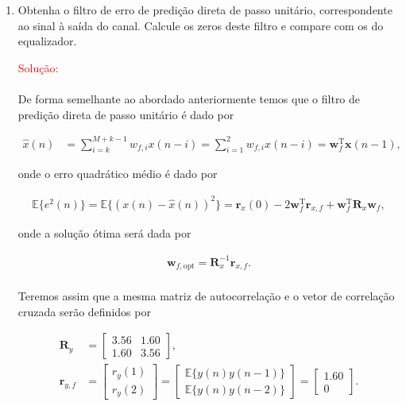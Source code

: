 \documentclass[a4paper,10pt]{article}
\begin{document}
\begin{enumerate}
\begin{enumerate}
					\item Obtenha o ﬁltro de erro de predição direta de passo unitário, correspondente ao sinal à saída do canal. Calcule os zeros deste ﬁltro e compare com os do equalizador.
					
						\textcolor{red}{Solução:}

						\paragraph{}De forma semelhante ao abordado anteriormente temos que o filtro de predição direta de passo unitário é dado por
						
						\begin{align}
							\hat{x}(n) &= \sum^{M + k - 1}_{i = k} w_{f,i} x(n - i) = \sum^{2}_{i = 1} w_{f,i} x(n - i) = \mathbf{w}^{\text{T}}_{f} \mathbf{x}(n - 1),
						\end{align}

						onde o erro quadrático médio é dado por

						\begin{align}
							\mathbb{E}\{e^{2}(n)\} = \mathbb{E}\{(x(n) - \hat{x}(n) )^{2}\} = \mathbf{r}_{x}(0) - 2 \mathbf{w}^{\text{T}}_{f} \mathbf{r}_{x,f} + \mathbf{w}^{\text{T}}_{f} \mathbf{R}_{x} \mathbf{w}_{f},
						\end{align}

						onde a solução ótima será dada por

						\begin{align}
							\mathbf{w}_{f,\text{opt}} = \mathbf{R}^{-1}_{x} \mathbf{r}_{x,f}.
						\end{align}

						\paragraph{}Teremos assim que a mesma matriz de autocorrelação e o vetor de correlação cruzada serão definidos por

						\begin{align}
							\mathbf{R}_{y} &=
							\begin{bmatrix}
								3.56 & 1.60 \\
								1.60 & 3.56
							\end{bmatrix}, \\
							\mathbf{r}_{y,f} &= 
							\begin{bmatrix}
								r_{y}(1) \\
								r_{y}(2)
							\end{bmatrix} =
							\begin{bmatrix}
								\mathbb{E}\{y(n) y(n - 1)\} \\
								\mathbb{E}\{y(n) y(n - 2)\}
							\end{bmatrix} = 
							\begin{bmatrix}
								1.60 \\
								0
							\end{bmatrix}.
						\end{align}


\end{enumerate}
\end{enumerate}
\end{document}
